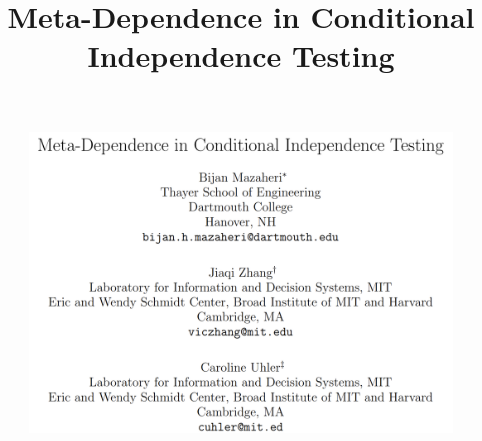\documentclass{beamer}
\begin{document}
\title[]{Meta-Dependence in Conditional Independence Testing}
\date{}

\begin{frame}
	\begin{figure}
		\includegraphics[scale=0.15]{imgs/title.png}
	\end{figure}
\end{frame}
\end{document}
